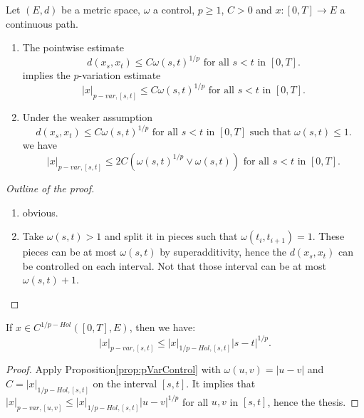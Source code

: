 \begin{proposition}\label{prop:pVarControl}
    Let $(E,d)$ be a metric space, $\omega$ a control, $p \geq 1$, $C>0$ and $x:[0,T] \rightarrow E$ a continuous path.
    \begin{enumerate}
        \item The pointwise estimate 
        \begin{equation}
            d(x_s, x_t) \leq C \omega(s,t)^{1/p} \text{ for all } s < t \text{ in } [0,T].
        \end{equation}
        implies the $p$-variation estimate
        \begin{equation}
            |x|_{p-var, [s,t]} \leq C \omega(s,t)^{1/p} \text{ for all } s < t \text{ in } [0,T].
        \end{equation}
        \item Under the weaker assumption 
        \begin{equation}
            d(x_s, x_t) \leq C \omega(s, t)^{1/p} \text{ for all } s < t \text{ in } [0,T] \text{ such that } \omega(s,t) \leq 1.
        \end{equation}
        we have
        \begin{equation}
            |x|_{p-var, [s,t]} \leq 2 C \left( \omega(s,t)^{1/p} \vee \omega(s,t) \right) \text{ for all } s < t \text{ in } [0,T].
        \end{equation}
    \end{enumerate}

\end{proposition}
\begin{proof}[Outline of the proof]
    \begin{enumerate}
        \item obvious.
        \item Take $\omega(s,t) > 1$ and split it in pieces such that $\omega(t_i, t_{i+1})=1$. These pieces can be at most $\omega(s,t)$ by superadditivity, hence the $d(x_s,x_t)$ can be controlled on each interval. Not that those interval can be at most $\omega(s,t) + 1$.
    \end{enumerate}
\end{proof}

\begin{corollary}\label{lem:pHolderControl}
    If $x \in C^{1/p-Hol}([0,T], E)$, then we have:
    \begin{equation}
        |x|_{p-var, [s,t]} \leq |x|_{1/p-Hol,[s,t]} |s - t|^{1/p}.
    \end{equation}
\end{corollary}
\begin{proof}
    Apply Proposition\ref{prop:pVarControl} with $\omega(u,v) = |u - v|$ and $C = |x|_{1/p-Hol,[s,t]}$ on the interval $[s,t]$.
    It implies that $|x|_{p-var, [u,v]} \leq |x|_{1/p-Hol,[s,t]} |u - v|^{1/p}$ for all $u, v$ in $[s,t]$, hence the thesis.
\end{proof}

